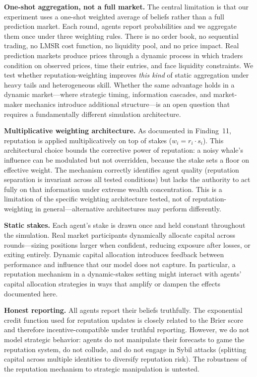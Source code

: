 \documentclass[conference]{IEEEtran}
\begin{document}
\textbf{One-shot aggregation, not a full market.} The central limitation is that our experiment uses a one-shot weighted average of beliefs rather than a full prediction market. Each round, agents report probabilities and we aggregate them once under three weighting rules. There is no order book, no sequential trading, no LMSR cost function, no liquidity pool, and no price impact. Real prediction markets produce prices through a dynamic process in which traders condition on observed prices, time their entries, and face liquidity constraints. We test whether reputation-weighting improves \emph{this kind} of static aggregation under heavy tails and heterogeneous skill. Whether the same advantage holds in a dynamic market---where strategic timing, information cascades, and market-maker mechanics introduce additional structure---is an open question that requires a fundamentally different simulation architecture.

\textbf{Multiplicative weighting architecture.} As documented in Finding~11, reputation is applied multiplicatively on top of stakes ($w_i = r_i \cdot s_i$). This architectural choice bounds the corrective power of reputation: a noisy whale's influence can be modulated but not overridden, because the stake sets a floor on effective weight. The mechanism correctly identifies agent quality (reputation separation is invariant across all tested conditions) but lacks the authority to act fully on that information under extreme wealth concentration. This is a limitation of the specific weighting architecture tested, not of reputation-weighting in general---alternative architectures may perform differently.

\textbf{Static stakes.} Each agent's stake is drawn once and held constant throughout the simulation. Real market participants dynamically allocate capital across rounds---sizing positions larger when confident, reducing exposure after losses, or exiting entirely. Dynamic capital allocation introduces feedback between performance and influence that our model does not capture. In particular, a reputation mechanism in a dynamic-stakes setting might interact with agents' capital allocation strategies in ways that amplify or dampen the effects documented here.

\textbf{Honest reporting.} All agents report their beliefs truthfully. The exponential credit function used for reputation updates is closely related to the Brier score and therefore incentive-compatible under truthful reporting. However, we do not model strategic behavior: agents do not manipulate their forecasts to game the reputation system, do not collude, and do not engage in Sybil attacks (splitting capital across multiple identities to diversify reputation risk). The robustness of the reputation mechanism to strategic manipulation is untested.
\end{document}
